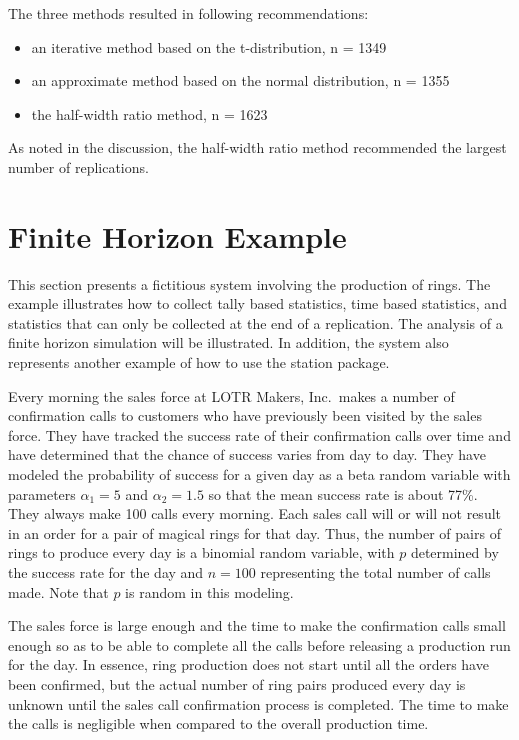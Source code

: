 \documentclass[
]{book}
\theoremstyle{definition}
\theoremstyle{definition}
\theoremstyle{definition}
\theoremstyle{definition}
\theoremstyle{remark}
\begin{document}
The three methods resulted in following recommendations:

\begin{itemize}
\item
  an iterative method based on the t-distribution, n = 1349
\item
  an approximate method based on the normal distribution, n = 1355
\item
  the half-width ratio method, n = 1623
\end{itemize}

As noted in the discussion, the half-width ratio method recommended the
largest number of replications.

\hypertarget{simoa:finhorizonex}{%
\section{Finite Horizon Example}\label{simoa:finhorizonex}}

This section presents a fictitious system involving the production of rings. The example illustrates how to collect tally based
statistics, time based statistics, and statistics that can only be
collected at the end of a replication. The analysis of a finite horizon
simulation will be illustrated. In addition, the
system also represents another example of how to use the station package.

Every morning the sales force at LOTR Makers, Inc.~makes a number of confirmation
calls to customers who have previously been visited by the sales force.
They have tracked the success rate of their confirmation calls over time
and have determined that the chance of success varies from day to day.
They have modeled the probability of success for a given day as a beta
random variable with parameters \(\alpha_1 = 5\) and \(\alpha_2 = 1.5\) so
that the mean success rate is about 77\%. They always make 100 calls
every morning. Each sales call will or will not result in an order for a
pair of magical rings for that day. Thus, the number of pairs of rings
to produce every day is a binomial random variable, with \(p\) determined
by the success rate for the day and \(n = 100\) representing the total
number of calls made. Note that \(p\) is random in this modeling.

The sales force is large enough and the time to make the confirmation
calls small enough so as to be able to complete all the calls before
releasing a production run for the day. In essence, ring production does
not start until all the orders have been confirmed, but the actual
number of ring pairs produced every day is unknown until the sales call
confirmation process is completed. The time to make the calls is
negligible when compared to the overall production time.
\end{document}
